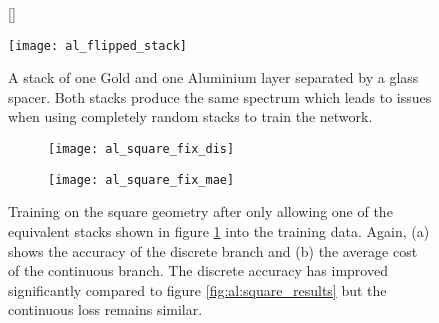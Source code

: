 \begin{figure}[H]
    [\FBwidth]
    {\caption{A stack of one Gold and one Aluminium layer separated by a glass spacer. Both stacks produce the same spectrum which leads to issues when using completely random stacks to train the network.}
    \label{fig:al:same_spec}}
    {\texttt{[image: al\_flipped\_stack]}}
\end{figure}


\begin{figure}[H]
\centering
\begin{subfigure}{.5\textwidth}
    \centering
    \texttt{[image: al\_square\_fix\_dis]}
    \caption{}
    \label{}
\end{subfigure}%
\begin{subfigure}{.5\textwidth}
    \centering
    \texttt{[image: al\_square\_fix\_mae]}
    \caption{}
    \label{}
\end{subfigure}
\caption{Training on the square geometry after only allowing one of the equivalent stacks shown in figure \ref{fig:al:same_spec} into the training data.
Again, (a) shows the accuracy of the discrete branch and (b) the average cost of the continuous branch. The discrete accuracy has improved significantly compared to figure \ref{fig:al:square_results} but the continuous loss remains similar.}
\label{fig:al:squares_fix}
\end{figure}


